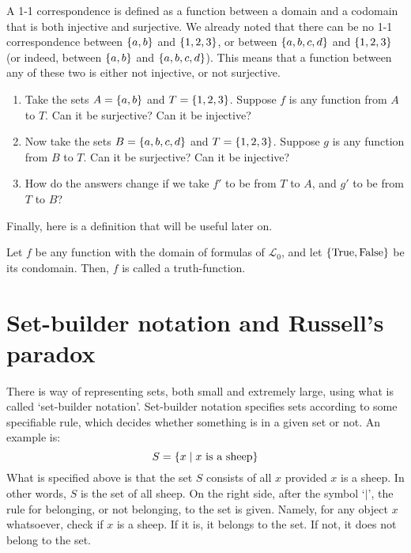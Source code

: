 \begin{exc}
	A 1-1 correspondence is defined as a function between a domain and a codomain that is both injective and surjective. We already noted that there can be no 1-1 correspondence between $\{a,b\}$ and $\{1,2,3\}$, or between $\{a, b, c, d\}$ and $\{1, 2, 3\}$ (or indeed, between $\{a, b\}$ and $\{a,b,c,d\}$). This means that a function between any of these two is either not injective, or not surjective. 
	
	\begin{enumerate}
	\item Take the sets $A=\{a, b\}$ and $T=\{1, 2, 3\}$. Suppose $f$ is any function from $A$ to $T$. Can it be surjective? Can it be injective?
	\item Now take the sets $B=\{a, b, c, d\}$ and $T=\{1, 2, 3\}$. Suppose $g$ is any function from $B$ to $T$. Can it be surjective? Can it be injective?
	\item How do the answers change if we take $f'$ to be from $T$ to $A$, and $g'$ to be from $T$ to $B$?
	\end{enumerate}
\end{exc}

Finally, here is a definition that will be useful later on. 

\begin{defn}
Let $f$ be any function with the domain of formulas of $\mathcal{L}_0$, and let $\{\text{True}, \text{False}\}$ be its condomain. Then, $f$ is called a truth-function. 
\end{defn}

\section{Set-builder notation and Russell's paradox}

There is  way of representing sets, both small and extremely large, using what is called `set-builder notation'. Set-builder notation specifies sets according to some specifiable rule, which decides whether something is in a given set or not. An example is:
\[
S=\{x \mid x\text{ is a sheep}\}
\]
What is specified above is that the set $S$ consists of all $x$ provided $x$ is a sheep. In other words, $S$ is the set of all sheep. On the right side, after the symbol `$\mid$', the rule for belonging, or not belonging, to the set is given. Namely, for any object $x$ whatsoever, check if $x$ is a sheep. If it is, it belongs to the set. If not, it does not belong to the set. 


